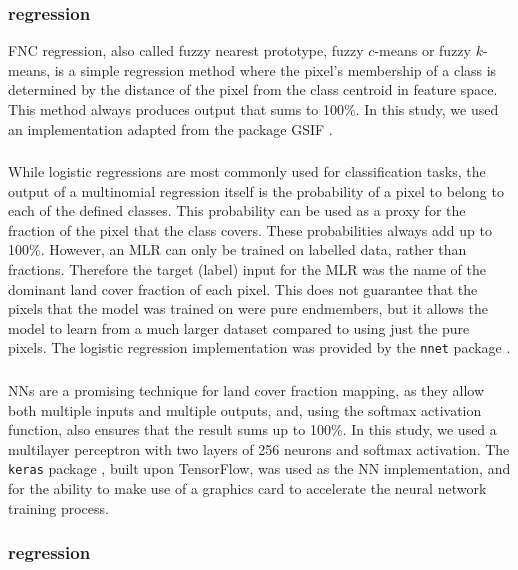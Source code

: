 \documentclass[a4paper,10pt]{article}
\begin{document}
\subsubsection{ regression}

\Gls{FNC} regression, also called fuzzy nearest prototype, fuzzy $c$-means or fuzzy $k$-means, is a simple regression method where the pixel's membership of a class is determined by the distance of the pixel from the class centroid in feature space.
This method always produces output that sums to 100\%.
In this study, we used an implementation adapted from the package GSIF \citep{hengl2004fuzzycmeans}.

\subsubsection{}

While logistic regressions are most commonly used for classification tasks, the output of a multinomial regression itself is the probability of a pixel to belong to each of the defined classes.
This probability can be used as a proxy for the fraction of the pixel that the class covers.
These probabilities always add up to 100\%.
However, an \ac{MLR} can only be trained on labelled data, rather than fractions.
Therefore the target (label) input for the \ac{MLR} was the name of the dominant land cover fraction of each pixel.
This does not guarantee that the pixels that the model was trained on were pure endmembers, but it allows the model to learn from a much larger dataset compared to using just the pure pixels.
The logistic regression implementation was provided by the \texttt{nnet} package \citep{nnet}.

\subsubsection{}

\Glspl{NN} are a promising technique for land cover fraction mapping, as they allow both multiple inputs and multiple outputs, and, using the softmax activation function, also ensures that the result sums up to 100\%.
In this study, we used a multilayer perceptron with two layers of 256 neurons and softmax activation.
The \texttt{keras} package \citep{keras}, built upon TensorFlow, was used as the \ac{NN} implementation, and for the ability to make use of a graphics card to accelerate the neural network training process.

\subsubsection{ regression}
\end{document}

